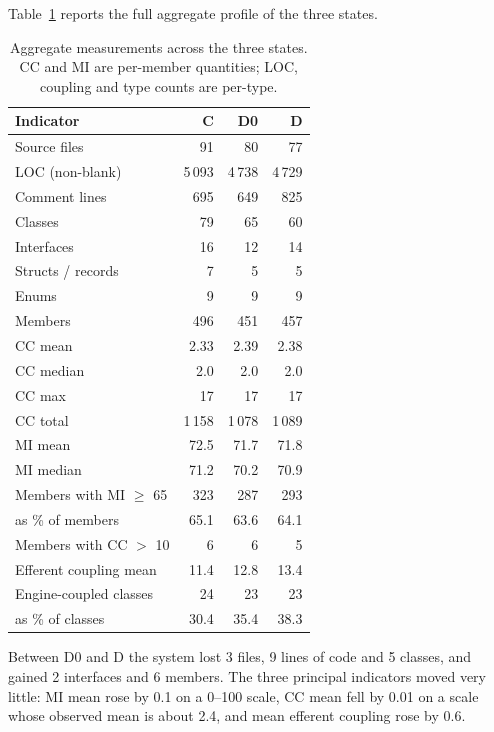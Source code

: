 \documentclass{sbc2019}%
\begin{document}
Table~\ref{tab:aggregate} reports the full aggregate profile of the three
states.

\begin{table}[htb]
\centering
\caption{Aggregate measurements across the three states. CC and MI are
per-member quantities; LOC, coupling and type counts are per-type.}\label{tab:aggregate}
\small
\begin{tabular}{lrrr}
\toprule
\textbf{Indicator} & \textbf{C} & \textbf{D0} & \textbf{D} \\
\midrule
Source files            & 91    & 80    & 77 \\
LOC (non-blank)         & 5\,093 & 4\,738 & 4\,729 \\
Comment lines           & 695   & 649   & 825 \\
Classes                 & 79    & 65    & 60 \\
Interfaces              & 16    & 12    & 14 \\
Structs / records       & 7     & 5     & 5 \\
Enums                   & 9     & 9     & 9 \\
Members                 & 496   & 451   & 457 \\
\addlinespace
CC mean                 & 2.33  & 2.39  & 2.38 \\
CC median               & 2.0   & 2.0   & 2.0 \\
CC max                  & 17    & 17    & 17 \\
CC total                & 1\,158 & 1\,078 & 1\,089 \\
\addlinespace
MI mean                 & 72.5  & 71.7  & 71.8 \\
MI median               & 71.2  & 70.2  & 70.9 \\
Members with MI $\geq$ 65 & 323 & 287   & 293 \\
\quad as \% of members   & 65.1  & 63.6  & 64.1 \\
Members with CC $>$ 10   & 6     & 6     & 5 \\
\addlinespace
Efferent coupling mean  & 11.4  & 12.8  & 13.4 \\
Engine-coupled classes  & 24    & 23    & 23 \\
\quad as \% of classes  & 30.4  & 35.4  & 38.3 \\
\bottomrule
\end{tabular}
\end{table}

Between D0 and D the system lost 3 files, 9 lines of code and 5 classes, and
gained 2 interfaces and 6 members. The three principal indicators moved very
little: MI mean rose by 0.1 on a 0--100 scale, CC mean fell by 0.01 on a scale
whose observed mean is about 2.4, and mean efferent coupling rose by 0.6.
\end{document}
